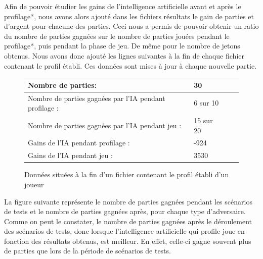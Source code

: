 \documentclass{report}
\begin{document}
\hspace{0.5cm}Afin de pouvoir étudier les gains de l'intelligence artificielle avant et après le profilage*, nous avons alors ajouté dans les fichiers résultats le gain de parties et d'argent pour chacune des parties. Ceci nous a permis de pouvoir obtenir un ratio du nombre de parties gagnées sur le nombre de parties jouées pendant le profilage*, puis pendant la phase de jeu. De même pour le nombre de jetons obtenus. Nous avons donc ajouté les lignes suivantes à la fin de chaque fichier contenant le profil établi. Ces données sont mises à jour à chaque nouvelle partie.\\

\begin{figure}[H]
\begin{center}
\begin{tabular}{|l|l|l|l|}
\hline
Nombre de parties:&	30		\\
\hline
Nombre de parties gagnées par l'IA pendant profilage :& 6 sur 10\\
\hline
Nombre de parties gagnées par l'IA pendant jeu :& 15 sur 20\\
\hline
Gains de l'IA pendant profilage :& -924		\\
\hline
Gains de l'IA pendant jeu :&	3530		\\
\hline
\end{tabular}
\end{center}
\caption{Données situées à la fin d'un fichier contenant le profil établi d'un joueur}
\end{figure}

La figure suivante représente le nombre de parties gagnées pendant les scénarios de tests et le nombre de parties gagnées après, pour chaque type d'adversaire. Comme on peut le constater, le nombre de parties gagnées après le déroulement des scénarios de tests, donc lorsque l'intelligence artificielle qui profile joue en fonction des résultats obtenus, est meilleur. En effet, celle-ci gagne souvent plus de parties que lors de la période de scénarios de tests. \\
\end{document}
